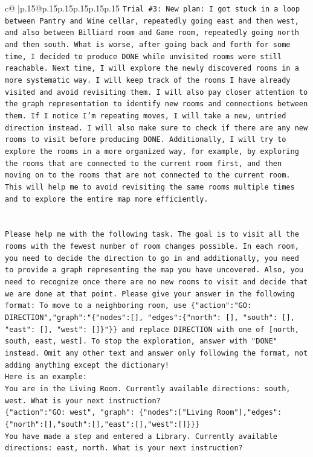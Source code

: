 \documentclass{article}
\begin{document}
{\begin{supertabular}{c@{$\;$}|p{.15\linewidth}@{}p{.15\linewidth}p{.15\linewidth}p{.15\linewidth}p{.15\linewidth}p{.15\linewidth}}
{{{\texttt{Trial \#3: New plan: I got stuck in a loop between Pantry and Wine cellar, repeatedly going east and then west, and also between Billiard room and Game room, repeatedly going north and then south. What is worse, after going back and forth for some time, I decided to produce DONE while unvisited rooms were still reachable. Next time, I will explore the newly discovered rooms in a more systematic way. I will keep track of the rooms I have already visited and avoid revisiting them. I will also pay closer attention to the graph representation to identify new rooms and connections between them. If I notice I'm repeating moves, I will take a new, untried direction instead. I will also make sure to check if there are any new rooms to visit before producing DONE. Additionally, I will try to explore the rooms in a more organized way, for example, by exploring the rooms that are connected to the current room first, and then moving on to the rooms that are not connected to the current room. This will help me to avoid revisiting the same rooms multiple times and to explore the entire map more efficiently.} \\
\\ 
\\ 
\texttt{Please help me with the following task. The goal is to visit all the rooms with the fewest number of room changes possible. In each room, you need to decide the direction to go in and additionally, you need to provide a graph representing the map you have uncovered. Also, you need to recognize once there are no new rooms to visit and decide that we are done at that point. Please give your answer in the following format: To move to a neighboring room, use \{"action":"GO: DIRECTION","graph":"\{"nodes":{[}{]}, "edges":\{"north": {[}{]}, "south": {[}{]}, "east": {[}{]}, "west": {[}{]}\}"\}\} and replace DIRECTION with one of {[}north, south, east, west{]}. To stop the exploration, answer with "DONE" instead. Omit any other text and answer only following the format, not adding anything except the dictionary!} \\
\texttt{Here is an example: } \\
\texttt{You are in the Living Room. Currently available directions: south, west. What is your next instruction?} \\
\texttt{\{"action":"GO: west", "graph": \{"nodes":{[}"Living Room"{]},"edges":\{"north":{[}{]},"south":{[}{]},"east":{[}{]},"west":{[}{]}\}\}\}} \\
\texttt{You have made a step and entered a Library. Currently available directions: east, north. What is your next instruction?} \\
}}}
\end{supertabular}}
\end{document}
